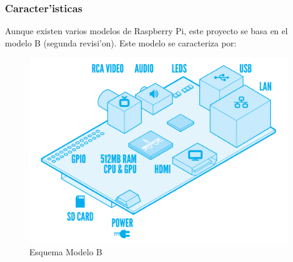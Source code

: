 \documentclass[twoside,12pt]{article}
\begin{document}
\subsubsection{Caracter'isticas}
Aunque existen varios modelos de Raspberry Pi, este proyecto se basa en el modelo B (segunda revisi'on). Este modelo se caracteriza por:

\begin{figure}[ht]
\centering
\includegraphics[scale=0.15]{images/RaspiModelB.png} 
\caption{Esquema Modelo B}
\label{fig:Esquema Modelo B}
\end{figure}
\end{document}

